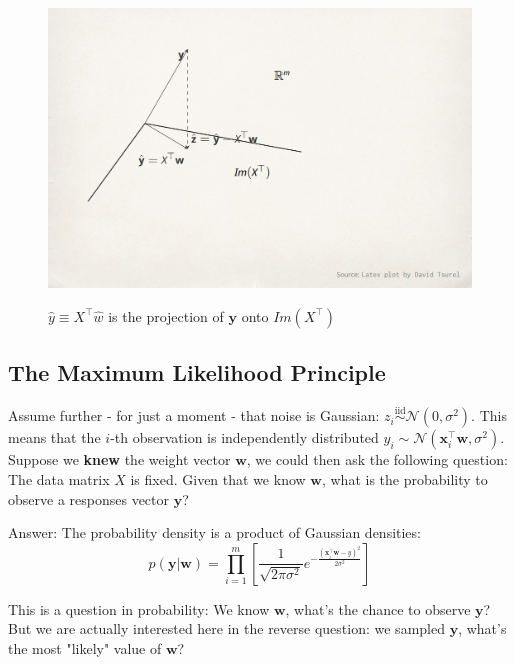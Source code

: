 \documentclass[11pt]{article}
\newcommand{\Tr}{\ensuremath{\top}}
\newcommand{\Nc}{\mathcal{N}}
\newcommand{\iid}{\stackrel{\text{iid}}{\sim}}
\begin{document}
\begin{figure}[h!]
  \centering
    \includegraphics[width=5.5in]{Geometry2.png} \\
 \caption{$\hat{y}\equiv X^\Tr \hat{w}$ is the projection of $\mathbf{y}$ onto $Im(X^\Tr)$}
\end{figure}





\subsection{The Maximum Likelihood Principle}
 Assume further - for just a moment - that noise is Gaussian: $z_i\iid\Nc(0,\sigma^2)$. This means that the $i$-th observation is independently distributed $y_i\sim \Nc(\mathbf{x}_i^\Tr \mathbf{w},\sigma^2)$.
Suppose we {\bf knew} the weight vector $\mathbf{w}$, we could then ask the following question: The data matrix $X$ is fixed. Given that we know
          $\mathbf{w}$, what is the probability to observe a responses vector $\mathbf{y}$?

Answer: The probability density is a product of Gaussian densities:
          \[p(\mathbf{y}|\mathbf{w}) = \prod_{i=1}^m \left[ \frac{1}{\sqrt{2\pi
            \sigma^2}} e^{-\frac{(\mathbf{x}_i^\Tr \mathbf{w}-y)^2}{2\sigma^2}}\right]
          \]

This is a question in probability: We know $\mathbf{w}$, what's the chance to observe $\mathbf{y}$? But we are actually interested here in the reverse question: we sampled
$\mathbf{y}$, what's the most "likely" value of $\mathbf{w}$?
\end{document}
